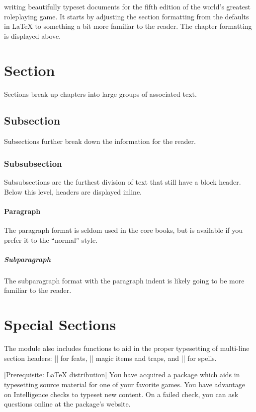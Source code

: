 \documentclass[../main.tex]{subfiles}
\begin{document}
 writing beautifully typeset documents for the fifth edition of the world's greatest roleplaying game. It starts by adjusting the section formatting from the defaults in \LaTeX{} to something a bit more familiar to the reader. The chapter formatting is displayed above.

\section{Section}
Sections break up chapters into large groups of associated text.

\subsection{Subsection}
Subsections further break down the information for the reader.

\subsubsection{Subsubsection}
Subsubsections are the furthest division of text that still have a block header. Below this level, headers are displayed inline.

\paragraph{Paragraph}
The paragraph format is seldom used in the core books, but is available if you prefer it to the ``normal'' style.

\subparagraph{Subparagraph}
The subparagraph format with the paragraph indent is likely going to be more familiar to the reader.

\section{Special Sections}
The module also includes functions to aid in the proper typesetting of multi-line section headers: |\TimeStrikeFeatHeader| for feats, |\TimeStrikeItemHeader| magic items and traps, and |\TimeStrikeSpellHeader| for spells.

[Prerequisite: \LaTeX{} distribution]
You have acquired a package which aids in typesetting source material for one of your favorite games. You have advantage on Intelligence checks to typeset new content. On a failed check, you can ask questions online at the package's website.
\end{document}
